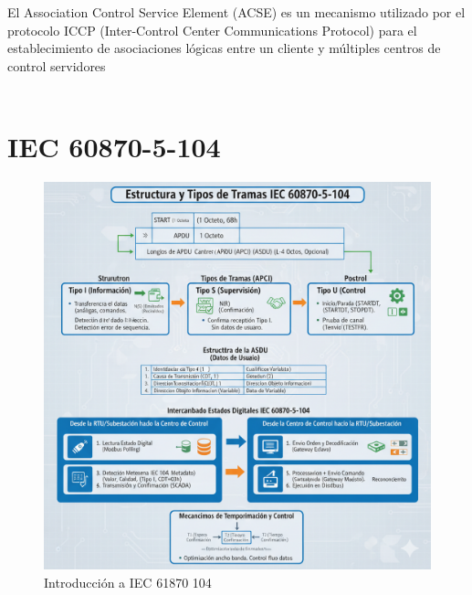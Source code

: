 \documentclass[a5paper]{book}%
\begin{document}
El Association Control Service Element (ACSE) es un mecanismo utilizado por el protocolo ICCP (Inter-Control Center Communications Protocol) para el establecimiento de asociaciones lógicas entre un cliente y múltiples centros de control servidores\\\\
 

\section{ IEC 60870-5-104}

\begin{figure}[H]
  \caption{Introducción a IEC 61870 104}
  \label{fig:capa7iccp}
  \includegraphics[width=\linewidth]{resumen_iec_61870_104}
\end{figure}
\end{document}
